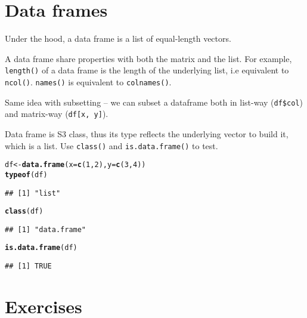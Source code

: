 \documentclass{article}\usepackage[]{graphicx}\usepackage[]{color}
\makeatletter
\newcommand{\hlnum}[1]{\textcolor[rgb]{0.686,0.059,0.569}{#1}}%
\newcommand{\hlstd}[1]{\textcolor[rgb]{0.345,0.345,0.345}{#1}}%
\newcommand{\hlkwb}[1]{\textcolor[rgb]{0.69,0.353,0.396}{#1}}%
\newcommand{\hlkwc}[1]{\textcolor[rgb]{0.333,0.667,0.333}{#1}}%
\newcommand{\hlkwd}[1]{\textcolor[rgb]{0.737,0.353,0.396}{\textbf{#1}}}%
\newenvironment{kframe}{%
 \def\at@end@of@kframe{}%
 \ifinner\ifhmode%
  \def\at@end@of@kframe{\end{minipage}}%
  \begin{minipage}{\columnwidth}%
 \fi\fi%
 \def\FrameCommand##1{\hskip\@totalleftmargin \hskip-\fboxsep
 \colorbox{shadecolor}{##1}\hskip-\fboxsep
     \hskip-\linewidth \hskip-\@totalleftmargin \hskip\columnwidth}%
 \MakeFramed {\advance\hsize-\width
   \@totalleftmargin\z@ \linewidth\hsize
   \@setminipage}}%
 {\par\unskip\endMakeFramed%
 \at@end@of@kframe}
\newenvironment{knitrout}{}{} %
\makeatother
\begin{document}
\section{Data frames}

Under the hood, a data frame is a list of equal-length vectors.

A data frame share properties with both the matrix and the list. For example, \verb`length()` of a data frame is the length of the underlying list, i.e equivalent to \verb`ncol()`. \verb`names()` is equivalent to \verb`colnames()`.

Same idea with subsetting -- we can subset a dataframe both in list-way (\verb`df$col`) and matrix-way (\verb`df[x, y]`).

Data frame is S3 class, thus its type reflects the underlying vector to build it, which is a list. Use \verb`class()` and \verb`is.data.frame()` to test.


\begin{knitrout}
\color{fgcolor}\begin{kframe}
\begin{alltt}
\hlstd{df} \hlkwb{<-} \hlkwd{data.frame}\hlstd{(}\hlkwc{x}\hlstd{=}\hlkwd{c}\hlstd{(}\hlnum{1}\hlstd{,}\hlnum{2}\hlstd{),} \hlkwc{y}\hlstd{=}\hlkwd{c}\hlstd{(}\hlnum{3}\hlstd{,}\hlnum{4}\hlstd{))}
\hlkwd{typeof}\hlstd{(df)}
\end{alltt}
\begin{verbatim}
## [1] "list"
\end{verbatim}
\begin{alltt}
\hlkwd{class}\hlstd{(df)}
\end{alltt}
\begin{verbatim}
## [1] "data.frame"
\end{verbatim}
\begin{alltt}
\hlkwd{is.data.frame}\hlstd{(df)}
\end{alltt}
\begin{verbatim}
## [1] TRUE
\end{verbatim}
\end{kframe}
\end{knitrout}

\section{Exercises}
\end{document}

